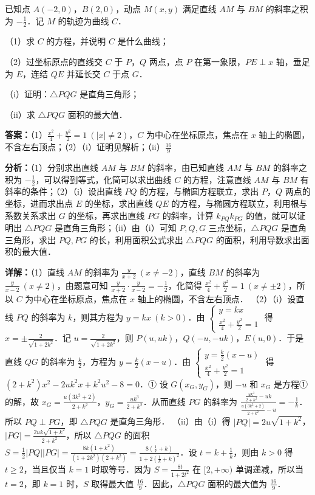 \begin{question}[points=12]
已知点 $A(-2,0)$，$B(2,0)$，动点 $M(x,y)$ 满足直线 $AM$ 与 $BM$ 的斜率之积为 $-\frac{1}{2}$．记 $M$ 的轨迹为曲线 $C$．

（1）求 $C$ 的方程，并说明 $C$ 是什么曲线；

（2）过坐标原点的直线交 $C$ 于 $P$，$Q$ 两点，点 $P$ 在第一象限，$PE\perp x$ 轴，垂足为 $E$，连结 $QE$ 并延长交 $C$ 于点 $G$．

     （i）证明：$\triangle PQG$ 是直角三角形；

     （ii）求 $\triangle PQG$ 面积的最大值．
\begin{solution}
\textbf{答案：}（1）$\frac{x^2}{4}+\frac{y^2}{2}=1\ (|x|\neq 2)$，$C$ 为中心在坐标原点，焦点在 $x$ 轴上的椭圆，不含左右顶点；（2）（i）证明见解析；（ii）$\frac{16}{9}$

\textbf{分析：}（1）分别求出直线 $AM$ 与 $BM$ 的斜率，由已知直线 $AM$ 与 $BM$ 的斜率之积为 $-\frac{1}{2}$，可以得到等式，化简可以求出曲线 $C$ 的方程，注意直线 $AM$ 与 $BM$ 有斜率的条件；（2）（i）设出直线 $PQ$ 的方程，与椭圆方程联立，求出 $P$，$Q$ 两点的坐标，进而求出点 $E$ 的坐标，求出直线 $QE$ 的方程，与椭圆方程联立，利用根与系数关系求出 $G$ 的坐标，再求出直线 $PG$ 的斜率，计算 $k_{PQ}k_{PG}$ 的值，就可以证明出 $\triangle PQG$ 是直角三角形；（ii）由（i）可知 $P,Q,G$ 三点坐标，$\triangle PQG$ 是直角三角形，求出 $PQ,PG$ 的长，利用面积公式求出 $\triangle PQG$ 的面积，利用导数求出面积的最大值．

\textbf{详解：}（1）直线 $AM$ 的斜率为 $\frac{y}{x+2}\ (x\neq -2)$，直线 $BM$ 的斜率为 $\frac{y}{x-2}\ (x\neq 2)$，由题意可知 $\frac{y}{x+2}\cdot\frac{y}{x-2}=-\frac{1}{2}$，化简得 $\frac{x^2}{4}+\frac{y^2}{2}=1\ (x\neq\pm 2)$，所以 $C$ 为中心在坐标原点，焦点在 $x$ 轴上的椭圆，不含左右顶点．
（2）（i）设直线 $PQ$ 的斜率为 $k$，则其方程为 $y=kx\ (k>0)$．由 $\begin{cases} y=kx \\ \frac{x^2}{4}+\frac{y^2}{2}=1 \end{cases}$ 得 $x=\pm\frac{2}{\sqrt{1+2k^2}}$．记 $u=\frac{2}{\sqrt{1+2k^2}}$，则 $P(u,uk)$，$Q(-u,-uk)$，$E(u,0)$．于是直线 $QG$ 的斜率为 $\frac{k}{2}$，方程为 $y=\frac{k}{2}(x-u)$．由 $\begin{cases} y=\frac{k}{2}(x-u) \\ \frac{x^2}{4}+\frac{y^2}{2}=1 \end{cases}$ 得 $(2+k^2)x^2-2uk^2x+k^2u^2-8=0$．① 设 $G(x_G,y_G)$，则 $-u$ 和 $x_G$ 是方程①的解，故 $x_G=\frac{u(3k^2+2)}{2+k^2}$，$y_G=\frac{uk^3}{2+k^2}$．从而直线 $PG$ 的斜率为 $\frac{\frac{uk^3}{2+k^2}-uk}{\frac{u(3k^2+2)}{2+k^2}-u}=-\frac{1}{k}$．所以 $PQ\perp PG$，即 $\triangle PQG$ 是直角三角形．
（ii）由（i）得 $|PQ|=2u\sqrt{1+k^2}$，$|PG|=\frac{2uk\sqrt{1+k^2}}{2+k^2}$，所以 $\triangle PQG$ 的面积 $S=\frac{1}{2}|PQ||PG|=\frac{8k(1+k^2)}{(1+2k^2)(2+k^2)}=\frac{8(\frac{1}{k}+k)}{1+2(\frac{1}{k}+k)^2}$．设 $t=k+\frac{1}{k}$，则由 $k>0$ 得 $t\geq 2$，当且仅当 $k=1$ 时取等号．因为 $S=\frac{8t}{1+2t^2}$ 在 $[2,+\infty)$ 单调递减，所以当 $t=2$，即 $k=1$ 时，$S$ 取得最大值 $\frac{16}{9}$．因此，$\triangle PQG$ 面积的最大值为 $\frac{16}{9}$．
\end{solution}
\end{question}

